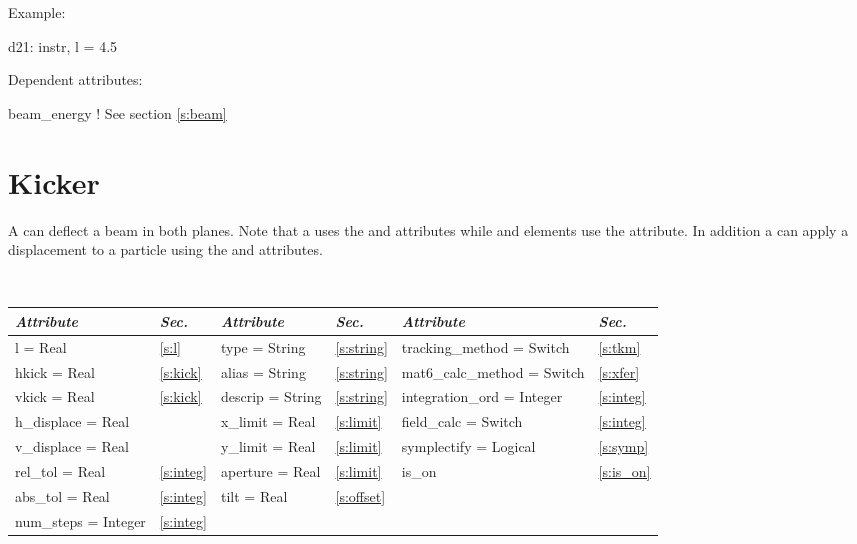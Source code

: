 \vskip0.05in \noindent
Example:
\begin{example}
  d21: instr, l = 4.5
\end{example}

\vskip0.05in \noindent
Dependent attributes:
\begin{example}
  beam\_energy  ! See section \ref{s:beam}
\end{example}

\section{Kicker}
\label{s:kicker}

A  can deflect a beam in both planes. Note that a
 uses the  and  attributes while
 and  elements use the  attribute. 
In addition a  can apply a displacement to a particle
using the  and  attributes.

\toffset
\begin{center}
\tt
\begin{tabular}{|l|l||l|l||l|l|} \hline
  {\sl Attribute} & {\sl Sec.} & {\sl Attribute} & {\sl Sec.} &  {\sl Attribute} & {\sl Sec.} \\ \hline
  l        = Real       & \ref{s:l}       & type = String      & \ref{s:string} & tracking\_method = Switch    & \ref{s:tkm}   \\ \hline
  hkick    = Real       & \ref{s:kick}    & alias = String     & \ref{s:string} & mat6\_calc\_method = Switch  & \ref{s:xfer}  \\ \hline
  vkick    = Real       & \ref{s:kick}    & descrip = String   & \ref{s:string} & integration\_ord = Integer   & \ref{s:integ} \\ \hline
  h\_displace = Real    &                 & x\_limit = Real    & \ref{s:limit}  & field\_calc = Switch         & \ref{s:integ} \\ \hline 
  v\_displace = Real    &                 & y\_limit = Real    & \ref{s:limit}  & symplectify = Logical        & \ref{s:symp}  \\ \hline
  rel\_tol = Real       & \ref{s:integ}   & aperture = Real    & \ref{s:limit}  & is\_on                       & \ref{s:is_on} \\ \hline
  abs\_tol = Real       & \ref{s:integ}   & tilt     = Real    & \ref{s:offset} &                              &               \\ \hline
  num\_steps = Integer  & \ref{s:integ}   &                    &                &                              &               \\ \hline
\end{tabular}
\end{center}
\toffset

